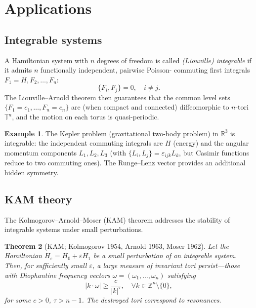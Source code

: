 \documentclass[12pt,a4paper]{amsart}
\newtheorem{theorem}{Theorem}[section]
\theoremstyle{definition}
\newtheorem{example}[theorem]{Example}
\begin{document}
\section{Applications}
\label{sec:applications}

\subsection{Integrable systems}

A Hamiltonian system with $n$ degrees of freedom is called \emph{(Liouville)
integrable} if it admits $n$ functionally independent, pairwise Poisson-
commuting first integrals $F_1 = H, F_2, \ldots, F_n$:
\[
  \{F_i, F_j\} = 0, \quad i \neq j.
\]
The Liouville--Arnold theorem then guarantees that the common level sets
$\{F_1 = c_1, \ldots, F_n = c_n\}$ are (when compact and connected)
diffeomorphic to $n$-tori $\mathbb{T}^n$, and the motion on each torus is
quasi-periodic.

\begin{example}
The Kepler problem (gravitational two-body problem) in $\mathbb{R}^3$ is
integrable: the independent commuting integrals are $H$ (energy) and the
angular momentum components $L_1, L_2, L_3$ (with $\{L_i, L_j\} =
\varepsilon_{ijk}L_k$, but Casimir functions reduce to two commuting ones).
The Runge--Lenz vector provides an additional hidden symmetry.
\end{example}

\subsection{KAM theory}

The Kolmogorov--Arnold--Moser (KAM) theorem addresses the stability of
integrable systems under small perturbations.

\begin{theorem}[KAM; Kolmogorov 1954, Arnold 1963, Moser 1962]
Let the Hamiltonian $H_\varepsilon = H_0 + \varepsilon H_1$ be a small
perturbation of an integrable system.  Then, for sufficiently small
$\varepsilon$, a large measure of invariant tori persist---those with
\emph{Diophantine} frequency vectors $\omega = (\omega_1, \ldots, \omega_n)$
satisfying
\[
  |k \cdot \omega| \geq \frac{c}{|k|^\tau}, \quad \forall k \in \mathbb{Z}^n
  \setminus \{0\},
\]
for some $c > 0$, $\tau > n-1$.  The destroyed tori correspond to
resonances.
\end{theorem}
\end{document}
